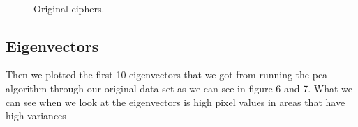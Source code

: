\documentclass[paper=a4, fontsize=11pt]{scrartcl} %
\begin{document}
\begin{figure}[h]
{        \label{fig:post}
    }
     \\
    \caption{Original ciphers.}
    \label{fig:ciph}
\end{figure}
\clearpage




\subsection{Eigenvectors}
Then we plotted the first 10 eigenvectors that we got from running the pca algorithm through our original data set as we can see in figure 6 and 7. What we can see when we look at the eigenvectors is high pixel values in areas that have high variances 
\end{document}
